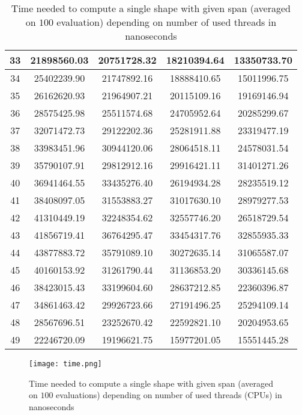 \documentclass[paper=a4, fontsize=11pt]{scrartcl} %
\numberwithin{equation}{section} %
\numberwithin{figure}{section} %
\numberwithin{table}{section} %
\begin{document}
\begin{table}[H]
\begin{tabular}{|c|c|c|c|c|}
33 & 21898560.03 & 20751728.32 & 18210394.64 & 13350733.70 \\ \hline
34 & 25402239.90 & 21747892.16 & 18888410.65 & 15011996.75 \\ \hline
35 & 26162620.93 & 21964907.21 & 20115109.16 & 19169146.94 \\ \hline
36 & 28575425.98 & 25511574.68 & 24705952.64 & 20285299.67 \\ \hline
37 & 32071472.73 & 29122202.36 & 25281911.88 & 23319477.19 \\ \hline
38 & 33983451.96 & 30944120.06 & 28064518.11 & 24578031.54 \\ \hline
39 & 35790107.91 & 29812912.16 & 29916421.11 & 31401271.26 \\ \hline
40 & 36941464.55 & 33435276.40 & 26194934.28 & 28235519.12 \\ \hline
41 & 38408097.05 & 31553883.27 & 31017630.10 & 28979277.53 \\ \hline
42 & 41310449.19 & 32248354.62 & 32557746.20 & 26518729.54 \\ \hline
43 & 41856719.41 & 36764295.47 & 33454317.76 & 32855935.33 \\ \hline
44 & 43877883.72 & 35791089.10 & 30272635.14 & 31065587.07 \\ \hline
45 & 40160153.92 & 31261790.44 & 31136853.20 & 30336145.68 \\ \hline
46 & 38423015.43 & 33199604.60 & 28637212.85 & 22360396.87 \\ \hline
47 & 34861463.42 & 29926723.66 & 27191496.25 & 25294109.14 \\ \hline
48 & 28567696.51 & 23252670.42 & 22592821.10 & 20204953.65 \\ \hline
49 & 22246720.09 & 19196621.75 & 15977201.05 & 15551445.28 \\ \hline

\end{tabular}
\caption{Time needed to compute a single shape with given span (averaged on
$100$ evaluation) depending on number of used threads in nanoseconds}
\label{tab:measurmentTime}
\end{table}

\begin{figure}[H]
\centering
\texttt{[image: time.png]}
\label{fig:timeGraph}
\caption{Time needed to compute a single shape with given span (averaged on
$100$ evaluations) depending on number of used threads (CPUs) in nanoseconds}
\end{figure}
\end{document}
